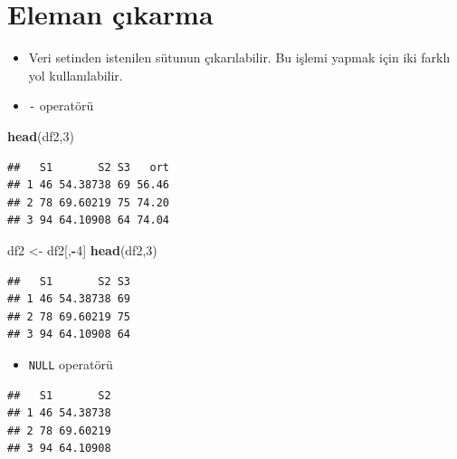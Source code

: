 \documentclass[
  oneside]{book}
\newenvironment{Shaded}{\begin{snugshade}}{\end{snugshade}}
\newcommand{\ConstantTok}[1]{\textcolor[rgb]{0.56,0.35,0.01}{#1}}
\newcommand{\DecValTok}[1]{\textcolor[rgb]{0.00,0.00,0.81}{#1}}
\newcommand{\FunctionTok}[1]{\textcolor[rgb]{0.13,0.29,0.53}{\textbf{#1}}}
\newcommand{\NormalTok}[1]{#1}
\newcommand{\OtherTok}[1]{\textcolor[rgb]{0.56,0.35,0.01}{#1}}
\newcommand{\SpecialCharTok}[1]{\textcolor[rgb]{0.81,0.36,0.00}{\textbf{#1}}}
\providecommand{\tightlist}{%
  \setlength{\itemsep}{0pt}\setlength{\parskip}{0pt}}
\begin{document}
\hypertarget{eleman-uxe7ux131karma}{%
\section{Eleman çıkarma}\label{eleman-uxe7ux131karma}}

\begin{itemize}
\item
  Veri setinden istenilen sütunun çıkarılabilir. Bu işlemi yapmak için iki farklı yol kullanılabilir.
\item
  \texttt{-} operatörü
\end{itemize}

\begin{Shaded}
\begin{Highlighting}[]
\FunctionTok{head}\NormalTok{(df2,}\DecValTok{3}\NormalTok{)}
\end{Highlighting}
\end{Shaded}

\begin{verbatim}
##   S1       S2 S3   ort
## 1 46 54.38738 69 56.46
## 2 78 69.60219 75 74.20
## 3 94 64.10908 64 74.04
\end{verbatim}

\begin{Shaded}
\begin{Highlighting}[]
\NormalTok{df2 }\OtherTok{\textless{}{-}}\NormalTok{ df2[,}\SpecialCharTok{{-}}\DecValTok{4}\NormalTok{] }
\FunctionTok{head}\NormalTok{(df2,}\DecValTok{3}\NormalTok{)}
\end{Highlighting}
\end{Shaded}

\begin{verbatim}
##   S1       S2 S3
## 1 46 54.38738 69
## 2 78 69.60219 75
## 3 94 64.10908 64
\end{verbatim}

\begin{itemize}
\tightlist
\item
  \texttt{NULL} operatörü
\end{itemize}

\begin{Shaded}
\end{Shaded}

\begin{verbatim}
##   S1       S2
## 1 46 54.38738
## 2 78 69.60219
## 3 94 64.10908
\end{verbatim}
\end{document}
